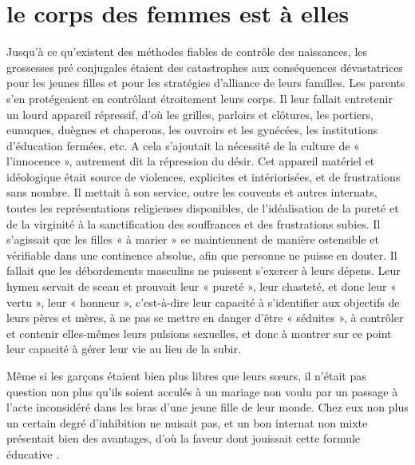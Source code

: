

\chapter{le corps des femmes est à elles}


 Jusqu'à ce qu'existent des méthodes fiables de contrôle des naissances, les grossesses pré conjugales étaient des catastrophes aux conséquences dévastatrices pour les jeunes filles et pour les stratégies d'alliance de leurs familles. Les parents s'en protégeaient en contrôlant étroitement leurs corps. Il leur fallait entretenir un lourd appareil répressif, d'où les grilles, parloirs et clôtures, les portiers, eunuques, duègnes et chaperons, les ouvroirs et les gynécées, les institutions d'éducation fermées, etc. A cela s'ajoutait la nécessité de la culture de « l'innocence », autrement dit la répression du désir. Cet appareil matériel et idéologique était source de violences, explicites et intériorisées, et de frustrations sans nombre. Il mettait à son service, outre les couvents et autres internats, toutes les représentations religieuses disponibles, de l'idéalisation de la pureté et de la virginité à la sanctification des souffrances et des frustrations subies. Il s'agissait que les filles « à marier » se maintiennent de manière ostensible et vérifiable dans une continence absolue, afin que personne ne puisse en douter. Il fallait que les débordements masculins ne puissent s'exercer à leurs dépens. Leur hymen servait de sceau et prouvait leur « pureté », leur chasteté, et donc leur « vertu », leur « honneur », c'est-à-dire leur capacité à s'identifier aux objectifs de leurs pères et mères, à ne pas se mettre en danger d'être « séduites », à contrôler et contenir elles-mêmes leurs pulsions sexuelles, et donc à montrer sur ce point leur capacité à gérer leur vie au lieu de la subir. 
 
 Même si les garçons étaient bien plus libres que leurs sœurs, il n'était pas question non plus qu'ils soient acculés à un mariage non voulu par un passage à l'acte inconsidéré dans les bras d'une jeune fille de leur monde. Chez eux non plus un certain degré d'inhibition ne nuisait pas, et un bon internat non mixte présentait bien des avantages, d'où la faveur dont jouissait cette formule éducative .

